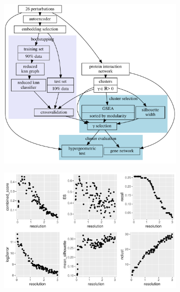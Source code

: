 \documentclass{article}
\begin{document}
\begin{figure}
	\begin{subfigure}[b]{0.5\textwidth}
		\includegraphics[width=\textwidth]{sel.dot.pdf}
		\caption{}
		\label{fig:}
	\end{subfigure}
	\hfill
	\begin{subfigure}[b]{0.5\textwidth}
		\includegraphics[width=\textwidth]{leiden.k17.optimization.pdf}

		\caption{}
		\label{}


\end{subfigure}
\end{figure}
\end{document}

